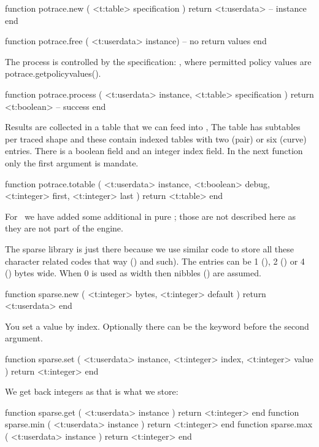 \starttyping[option=LUA]
function potrace.new ( <t:table> specification )
    return <t:userdata> -- instance
end
\stoptyping


\starttyping[option=LUA]
function potrace.free ( <t:userdata> instance)
    -- no return values
end
\stoptyping

The process is controlled by the specification: , where permitted policy values are \showenginekeylist
{potrace.getpolicyvalues()}.

\starttyping[option=LUA]
function potrace.process ( <t:userdata> instance, <t:table> specification )
    return <t:boolean> -- success
end
\stoptyping

Results are collected in a table that we can feed into \METAPOST, The table has
subtables per traced shape and these contain indexed tables with two (pair) or
six (curve) entries. There is a boolean  field and an integer \type
{index} field. In the next function only the first argument is mandate.

\starttyping[option=LUA]
function potrace.totable  (
    <t:userdata> instance,
    <t:boolean>  debug,
    <t:integer>  first,
    <t:integer>  last
)
    return <t:table>
end
\stoptyping

For \LUAMETAFUN\ we have added some additional in pure \LUA; those are not
described here as they are not part of the engine.

\stopsubsection

\startsubsection[title=Sparse hashes]

The sparse library is just there because we use similar code to store all these
character related codes that way (\type {\lccode}) and such). The entries can be
1 (), 2 () or 4 () bytes wide. When 0
is used as width then nibbles () are assumed.

\starttyping[option=LUA]
function sparse.new (
    <t:integer> bytes,
    <t:integer> default
)
    return <t:userdata>
end
\stoptyping

You set a value by index. Optionally there can be the  keyword
before the second argument.

\starttyping[option=LUA]
function sparse.set (
    <t:userdata> instance,
    <t:integer>  index,
    <t:integer>  value
)
    return <t:integer>
end
\stoptyping

We get back integers as that is what we store:

\starttyping[option=LUA]
function sparse.get ( <t:userdata> instance ) return <t:integer> end
function sparse.min ( <t:userdata> instance ) return <t:integer> end
function sparse.max ( <t:userdata> instance ) return <t:integer> end
\stoptyping

